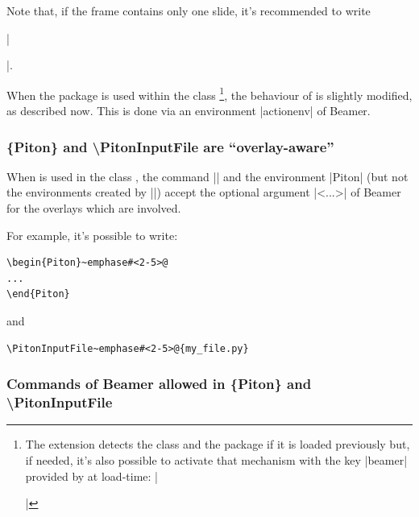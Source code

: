 \documentclass{article}
\begin{document}
Note that, if the frame contains only one slide, it's recommended to write

|\begin{frame}[fragile=singleslide]|.

\bigskip
When the package  is used within the class
\footnote{The extension  detects the class 
and the package  if it is loaded previously
but, if needed, it's also possible to activate that mechanism with the key
|beamer| provided by  at load-time:
|\usepackage[beamer]{piton}|}, the behaviour of  is slightly 
modified, as described now. This is done via an environment |{actionenv}| of
Beamer.

\subsubsection{\{Piton\} and \textbackslash PitonInputFile are
``overlay-aware''}

When  is used in the class , the command
|\PitonInputFile| and the environment |{Piton}| (but not the environments
created by |\NewPitonEnvironment|) accept the optional argument |<...>| of
Beamer for the overlays which are involved.

For example, it's possible to write:

\begin{Verbatim}
\begin{Piton}~emphase#<2-5>@
...
\end{Piton}
\end{Verbatim}

and 

\begin{Verbatim}
\PitonInputFile~emphase#<2-5>@{my_file.py}
\end{Verbatim}

\subsubsection{Commands of Beamer allowed in \{Piton\} and \textbackslash PitonInputFile}



\end{frame}
\end{document}
